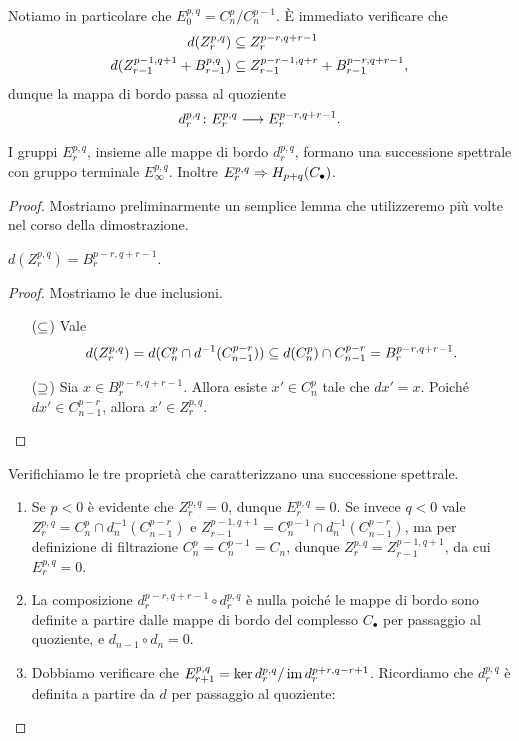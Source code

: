 Notiamo in particolare che \(E^{p,q}_0=C^p_n/C^{p-1}_n\). È immediato verificare che
\begin{align*}
d(Z^{p,q}_r)&\subseteq Z^{p-r,q+r-1}_r\\
d(Z^{p-1,q+1}_{r-1}+B^{p,q}_{r-1})&\subseteq Z^{p-r-1,q+r}_{r-1}+B^{p-r,q+r-1}_{r-1},
\end{align*}
dunque la mappa di bordo passa al quoziente
\[
\map{d^{p,q}_r}{E^{p,q}_r}{E^{p-r,q+r-1}_r}.
\]
\begin{proposition}
I gruppi \(E^{p,q}_r\), insieme alle mappe di bordo \(d^{p,q}_r\), formano una successione spettrale con gruppo terminale \(E^{p,q}_\infty\). Inoltre \(E^{p,q}_r\Rightarrow H_{p+q}(C_\bullet)\).
\end{proposition}
\begin{proof}
Mostriamo preliminarmente un semplice lemma che utilizzeremo più volte nel corso della dimostrazione.
\begin{lemma*}
\(d(Z^{p,q}_r)=B^{p-r,q+r-1}_r\).
\end{lemma*}
\begin{proof}
Mostriamo le due inclusioni.
\begin{itemize}
\item[(\(\subseteq\))] Vale
\[
d(Z^{p,q}_r)=d(C^p_n\cap d^{-1}(C^{p-r}_{n-1}))\subseteq d(C^p_n)\cap C^{p-r}_{n-1}=B^{p-r,q+r-1}_r.
\]
\item[(\(\supseteq\))] Sia \(x\in B^{p-r,q+r-1}_r\). Allora esiste \(x'\in C^p_n\) tale che \(dx'=x\). Poiché \(dx'\in C^{p-r}_{n-1}\), allora \(x'\in Z^{p,q}_r\).\qedhere
\end{itemize}
\end{proof}
Verifichiamo le tre proprietà che caratterizzano una successione spettrale.
\begin{enumerate}
\item Se \(p<0\) è evidente che \(Z^{p,q}_r=0\), dunque \(E^{p,q}_r=0\). Se invece \(q<0\) vale \(Z^{p,q}_r=C^p_n\cap d_n^{-1}(C^{p-r}_{n-1})\) e \(Z^{p-1,q+1}_{r-1}=C^{p-1}_n\cap d_n^{-1}(C^{p-r}_{n-1})\), ma per definizione di filtrazione \(C^p_n=C^{p-1}_n=C_n\), dunque \(Z^{p,q}_r=Z^{p-1,q+1}_{r-1}\), da cui \(E^{p,q}_r=0\).
\item La composizione \(d^{p-r,q+r-1}_r\circ d^{p,q}_r\) è nulla poiché le mappe di bordo sono definite a partire dalle mappe di bordo del complesso \(C_\bullet\) per passaggio al quoziente, e \(d_{n-1}\circ d_n=0\).
\item Dobbiamo verificare che \(E^{p,q}_{r+1}=\ker d^{p,q}_r/\operatorname{im} d^{p+r,q-r+1}_r\). Ricordiamo che \(d^{p,q}_r\) è definita a partire da \(d\) per passaggio al quoziente:

\end{enumerate}
\end{proof}
